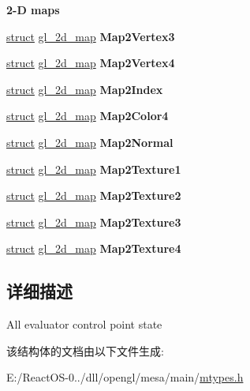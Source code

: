 \begin{Indent}\textbf{ 2-\/D maps}\par
\begin{DoxyCompactItemize}
\item 
\mbox{\label{structgl__evaluators_a5308e5c8f6a683717dd0d1676a58bb28}} 
\hyperlink{interfacestruct}{struct} \hyperlink{structgl__2d__map}{gl\+\_\+2d\+\_\+map} {\bfseries Map2\+Vertex3}
\item 
\mbox{\label{structgl__evaluators_a007dd0abc91c3f6afc3222ccfc3d9029}} 
\hyperlink{interfacestruct}{struct} \hyperlink{structgl__2d__map}{gl\+\_\+2d\+\_\+map} {\bfseries Map2\+Vertex4}
\item 
\mbox{\label{structgl__evaluators_aef72ea3b455ca06607c90fc807e05614}} 
\hyperlink{interfacestruct}{struct} \hyperlink{structgl__2d__map}{gl\+\_\+2d\+\_\+map} {\bfseries Map2\+Index}
\item 
\mbox{\label{structgl__evaluators_a77cdabe606aec888dda163a0f3348c1a}} 
\hyperlink{interfacestruct}{struct} \hyperlink{structgl__2d__map}{gl\+\_\+2d\+\_\+map} {\bfseries Map2\+Color4}
\item 
\mbox{\label{structgl__evaluators_a448c81bdf2f595e6ac544c61aadd941a}} 
\hyperlink{interfacestruct}{struct} \hyperlink{structgl__2d__map}{gl\+\_\+2d\+\_\+map} {\bfseries Map2\+Normal}
\item 
\mbox{\label{structgl__evaluators_a706c9d21254ccf725fb3c70991a7c94a}} 
\hyperlink{interfacestruct}{struct} \hyperlink{structgl__2d__map}{gl\+\_\+2d\+\_\+map} {\bfseries Map2\+Texture1}
\item 
\mbox{\label{structgl__evaluators_afb876904d3333f58ce9a88b84fba9c0f}} 
\hyperlink{interfacestruct}{struct} \hyperlink{structgl__2d__map}{gl\+\_\+2d\+\_\+map} {\bfseries Map2\+Texture2}
\item 
\mbox{\label{structgl__evaluators_af54238e4e1fe6b81a8e5a33c56b3d4c8}} 
\hyperlink{interfacestruct}{struct} \hyperlink{structgl__2d__map}{gl\+\_\+2d\+\_\+map} {\bfseries Map2\+Texture3}
\item 
\mbox{\label{structgl__evaluators_a19b334dc07ecd2e51ac4e240b0d904ef}} 
\hyperlink{interfacestruct}{struct} \hyperlink{structgl__2d__map}{gl\+\_\+2d\+\_\+map} {\bfseries Map2\+Texture4}
\end{DoxyCompactItemize}
\end{Indent}


\subsection{详细描述}
All evaluator control point state 

该结构体的文档由以下文件生成\+:\begin{DoxyCompactItemize}
\item 
E\+:/\+React\+O\+S-\/0../dll/opengl/mesa/main/\hyperlink{mtypes_8h}{mtypes.\+h}\end{DoxyCompactItemize}
